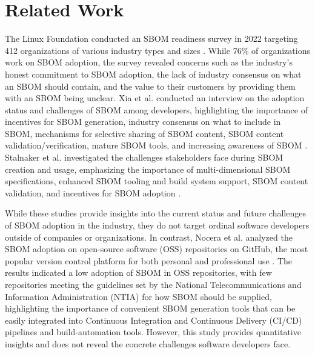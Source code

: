 \section{Related Work}
\label{sec:related}

The Linux Foundation conducted an SBOM readiness survey in 2022 targeting 412 organizations of various industry types and sizes \cite{linux-foundation-readiness}. While 76\% of organizations work on SBOM adoption, the survey revealed concerns such as the industry's honest commitment to SBOM adoption, the lack of industry consensus on what an SBOM should contain, and the value to their customers by providing them with an SBOM being unclear. Xia et al. conducted an interview on the adoption status and challenges of SBOM among developers, highlighting the importance of incentives for SBOM generation, industry consensus on what to include in SBOM, mechanisms for selective sharing of SBOM content, SBOM content validation/verification, mature SBOM tools, and increasing awareness of SBOM \cite{sbom-study}. Stalnaker et al. investigated the challenges stakeholders face during SBOM creation and usage, emphasizing the importance of multi-dimensional SBOM specifications, enhanced SBOM tooling and build system support, SBOM content validation, and incentives for SBOM adoption \cite{bomsaway-stakeholders-study}.

While these studies provide insights into the current status and future challenges of SBOM adoption in the industry, they do not target ordinal software developers outside of companies or organizations. In contrast, Nocera et al. analyzed the SBOM adoption on open-source software (OSS) repositories on GitHub, the most popular version control platform for both personal and professional use \cite{sbom-study-github}. The results indicated a low adoption of SBOM in OSS repositories, with few repositories meeting the guidelines set by the National Telecommunications and Information Administration (NTIA) for how SBOM should be supplied, highlighting the importance of convenient SBOM generation tools that can be easily integrated into Continuous Integration and Continuous Delivery (CI/CD) pipelines and build-automation tools. However, this study provides quantitative insights and does not reveal the concrete challenges software developers face.